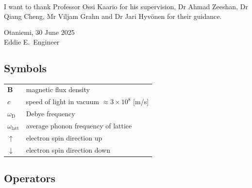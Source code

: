 \documentclass[english, 12pt, a4paper, elec, utf8, a-2b, online]{aaltothesis}
\begin{document}



\newpage




\dothesispagenumbering{}

I want to thank Professor Ossi Kaario for his supervision, Dr Ahmad Zeeshan, Dr Qiang Cheng, Mr Viljam Grahn and Dr Jari Hyvönen for their guidance.

\vspace{5cm}
Otaniemi, 30 June 2025\\

\vspace{5mm}
{\hfill Eddie E.\ Engineer \hspace{1cm}}

\newpage


\thesistableofcontents



\subsection*{Symbols}

\begin{tabular}{ll}
$\mathbf{B}$  & magnetic flux density  \\
$c$              & speed of light in vacuum $\approx 3\times10^8$ [m/s]\\
$\omega_{\mathrm{D}}$    & Debye frequency \\
$\omega_{\mathrm{latt}}$ & average phonon frequency of lattice \\
$\uparrow$       & electron spin direction up\\
$\downarrow$     & electron spin direction down
\end{tabular}

\subsection*{Operators}
\end{document}
